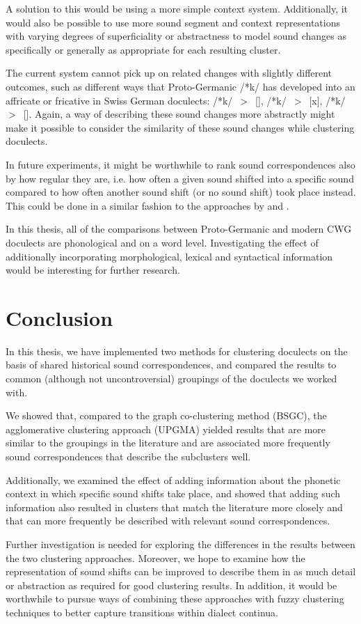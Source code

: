 \documentclass[a4paper]{article}
\begin{document}
A solution to this would be using a more simple context system.
Additionally, it would also be possible to 
use more sound segment and context representations with
varying degrees of superficiality or abstractness 
to model sound changes as specifically or generally as appropriate
for each resulting cluster.

The current system cannot pick up on related changes
with slightly different outcomes, such as different
ways that Proto-Germanic /*k/ has developed into
an affricate or fricative in Swiss German doculects:
/*k/~$>$~[], /*k/~$>$~[x], /*k/~$>$~[\textchi].
Again, a way of describing these sound changes more abstractly
might make it possible to consider the similarity of
these sound changes while clustering doculects.

In future experiments, it might be worthwhile to rank
sound correspondences also by how regular they are,
i.e. how often a given sound shifted into a specific sound
compared to how often another sound shift (or no sound shift) took place instead.
This could be done in a similar fashion to the approaches by
\citet{prokic2007identifying} and \citet{prokic2013combining}.

In this thesis, all of the comparisons between Proto-Germanic
and modern CWG doculects are phonological
and on a word level.
Investigating the effect of additionally incorporating
morphological, lexical and syntactical information
would be interesting for further research.

\section{Conclusion}
\label{sec:conclusion}

In this thesis, we have implemented two methods
for clustering doculects on the basis of shared
historical sound correspondences,
and compared the results to common (although not uncontroversial)
groupings of the doculects we worked with.

We showed that, compared to the graph co-clustering method (BSGC),
the agglomerative clustering approach (UPGMA)
yielded results that are more similar to the groupings in the literature
and are associated more frequently sound correspondences that
describe the subclusters well.

Additionally, we examined the effect of adding information about
the phonetic context in which specific sound shifts take place,
and showed that adding such information also resulted in
clusters that match the literature more closely and that
can more frequently be described with relevant sound correspondences.

Further investigation is needed for exploring the
differences in the results between the two clustering approaches.
Moreover, we hope to examine how the representation of
sound shifts can be improved to describe them in
as much detail or abstraction as required for good clustering results.
In addition, it would be worthwhile to pursue ways
of combining these approaches with fuzzy clustering techniques
to better capture transitions within dialect continua.



\end{document}
